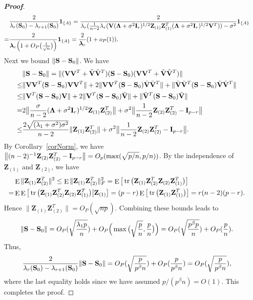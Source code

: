\documentclass[3p]{elsarticle}
\DeclareMathOperator{\mytr}{tr}
\DeclareMathOperator{\myE}{E}
\newcommand{\bZ}{\mathbf{Z}}
\newcommand{\bfsym}[1]{\ensuremath{\boldsymbol{#1}}}
\def\blambda {\bfsym {\lambda}}        \def\bLambda {\bfsym {\Lambda}}
\theoremstyle{plain}
\theoremstyle{definition}
\theoremstyle{remark}
\begin{document}
\begin{appendices}
\begin{proof}[\textbf{Proof}]
$$
\begin{aligned}
    &\frac{2}{\lambda_r(\BS_0)-\lambda_{r+1}(\BS_0)}\mathbf{1}_{\{A\}}
    =
    \frac{2}{
        \lambda_r(\frac{1}{n-2}\lambda_r(\BV(\bLambda+\sigma^2 \BI_r)^{1/2}\bZ_{(1)} \bZ_{(1)}^T(\bLambda+\sigma^2 \BI_r)^{1/2}\BV^T))-\sigma^2}\mathbf{1}_{\{A\}}\\
    =&\frac{2}{\blambda_r\Big(1+O_P\big(\frac{1}{\sqrt{n}}\big)\Big)}\mathbf{1}_{\{A\}}
    =\frac{2}{\blambda_r}(1+o_P(1)).
\end{aligned}
    $$
    Next we bound $\|\mathbf{S}-\mathbf{S}_0\|$. 
    We have
    $$
    \begin{aligned}
        &\|\BS-\BS_0\|=
        \|(\BV\BV^T+\tilde{\BV}\tilde{\BV}^T)(\BS-\BS_0)(\BV\BV^T+\tilde{\BV}\tilde{\BV}^T)\|\\
        \leq& \|\BV\BV^T (\BS-\BS_0) \BV\BV^T\|+2 \|\BV\BV^T (\BS-\BS_0) \tilde{\BV}\tilde{\BV}^T\|+\|\tilde{\BV}\tilde{\BV}^T (\BS-\BS_0) \tilde{\BV}\tilde{\BV}^T\|\\
        \leq& \|\BV^T (\BS-\BS_0) \BV\|+2 \|\BV^T (\BS-\BS_0) \tilde{\BV}\|+\|\tilde{\BV}^T (\BS-\BS_0) \tilde{\BV}\|\\
        = &
        2\big\|\frac{\sigma}{n-2}(\bLambda+\sigma^2 \BI_r)^{1/2}\bZ_{(1)} \bZ_{(2)}^T\big\|+
        \sigma^2\big\|\frac{1}{n-2}\bZ_{(2)} \bZ_{(2)}^T- \BI_{p-r}\big\|\\
        \leq & \frac{2\sqrt{(\lambda_1+\sigma^2)\sigma^2}}{n-2}\|\bZ_{(1)}\bZ_{(2)}^T\|+
        \sigma^2\big\|\frac{1}{n-2}\bZ_{(2)} \bZ_{(2)}^T- \BI_{p-r}\big\|.
    \end{aligned}
    $$
    By Corollary~\ref{corNorm}, we have $\big\|(n-2)^{-1}\bZ_{(2)} \bZ_{(2)}^T- \BI_{p-r}\big\|=O_p(\max(\sqrt{p/n},p/n))$.
    By the independence of $\bZ_{(1)}$ and $\bZ_{(2)}$, we have
    $$
    \begin{aligned}
        &\myE \|\bZ_{(1)}\bZ_{(2)}^T\|^2\leq
    \myE \|\bZ_{(1)}\bZ_{(2)}^T\|_F^2
    =
    \myE \big[ \mytr\big(\bZ_{(1)}\bZ_{(2)}^T\bZ_{(2)}\bZ_{(1)}^T\big) \big]\\
        =&
        \myE\myE \big[ \mytr\big(\bZ_{(1)}\bZ_{(2)}^T\bZ_{(2)}\bZ_{(1)}^T\big)\big|\BZ_{(1)} \big]
        =(p-r)
    \myE \big[ \mytr\big(\bZ_{(1)}\bZ_{(1)}^T\big) \big]
        =r(n-2)(p-r).
    \end{aligned}
    $$
    Hence $\|\bZ_{(1)}\bZ_{(2)}^T\|=O_P(\sqrt{np})$.
    Combining these bounds leads to
    $$
    \|\mathbf{S}-\mathbf{S}_0\|=
 O_P(\sqrt{\frac{\lambda_1 p}{n}})+O_P\Big(\max\big(\sqrt{\frac{p}{n}},\frac{p}{n}\big)\Big)
    =
    O_P(\sqrt{\frac{ p^{\beta}p}{n}})+O_P(\frac{p}{n}).
    $$
    Thus,
    $$
   \frac{2}{\lambda_r(\mathbf{S}_0)-\lambda_{r+1}(\mathbf{S}_0)}\|\mathbf{S}-\mathbf{S}_0\|=
    O_P(\sqrt{\frac{p}{p^{\beta}n}})+O_P(\frac{p}{p^{\beta}n})=
O_P(\sqrt{\frac{p}{p^{\beta}n}}),
    $$
    where the last equality holds since we have assumed $p/(p^{\beta}n)=O(1)$.
    This completes the proof.


\end{proof}
\end{appendices}
\end{document}
